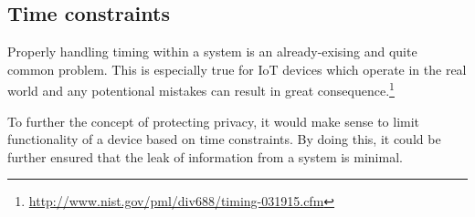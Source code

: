 \subsection{Time constraints}
Properly handling timing within a system is an already-exising and quite common problem.
This is especially true for IoT devices which operate in the real world and any potentional mistakes can result in great consequence.\footnote{\url{http://www.nist.gov/pml/div688/timing-031915.cfm}}

To further the concept of protecting privacy, it would make sense to limit functionality of a device based on time constraints.
By doing this, it could be further ensured that the leak of information from a system is minimal.
